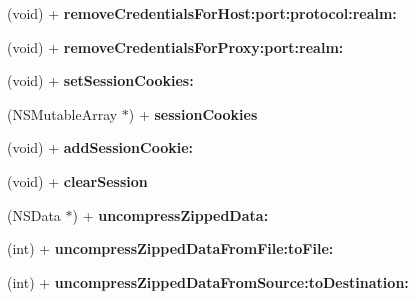 \begin{DoxyCompactItemize}
\item 
\hypertarget{interface_a_s_i_h_t_t_p_request_a5280dcb803450e7187587972ce540652}{
(void) + {\bfseries removeCredentialsForHost:port:protocol:realm:}}
\label{interface_a_s_i_h_t_t_p_request_a5280dcb803450e7187587972ce540652}

\item 
\hypertarget{interface_a_s_i_h_t_t_p_request_a213e5645cbf90459d6e7b987d24ddd33}{
(void) + {\bfseries removeCredentialsForProxy:port:realm:}}
\label{interface_a_s_i_h_t_t_p_request_a213e5645cbf90459d6e7b987d24ddd33}

\item 
\hypertarget{interface_a_s_i_h_t_t_p_request_aa1a0ecf9217c99bd0d252c0ff473ab22}{
(void) + {\bfseries setSessionCookies:}}
\label{interface_a_s_i_h_t_t_p_request_aa1a0ecf9217c99bd0d252c0ff473ab22}

\item 
\hypertarget{interface_a_s_i_h_t_t_p_request_a5995ee20ada072e51da56a940e0b0f28}{
(NSMutableArray $\ast$) + {\bfseries sessionCookies}}
\label{interface_a_s_i_h_t_t_p_request_a5995ee20ada072e51da56a940e0b0f28}

\item 
\hypertarget{interface_a_s_i_h_t_t_p_request_a9a6621daa1c2571d9d1cc0d46f912e56}{
(void) + {\bfseries addSessionCookie:}}
\label{interface_a_s_i_h_t_t_p_request_a9a6621daa1c2571d9d1cc0d46f912e56}

\item 
\hypertarget{interface_a_s_i_h_t_t_p_request_a85b93e4b30cdf106e45ee1b8d3a28f3d}{
(void) + {\bfseries clearSession}}
\label{interface_a_s_i_h_t_t_p_request_a85b93e4b30cdf106e45ee1b8d3a28f3d}

\item 
\hypertarget{interface_a_s_i_h_t_t_p_request_ab90a4101dc5b523195821de12ceae102}{
(NSData $\ast$) + {\bfseries uncompressZippedData:}}
\label{interface_a_s_i_h_t_t_p_request_ab90a4101dc5b523195821de12ceae102}

\item 
\hypertarget{interface_a_s_i_h_t_t_p_request_a2c4b220e54857d69fa7235bd6c78a294}{
(int) + {\bfseries uncompressZippedDataFromFile:toFile:}}
\label{interface_a_s_i_h_t_t_p_request_a2c4b220e54857d69fa7235bd6c78a294}

\item 
\hypertarget{interface_a_s_i_h_t_t_p_request_ae130a9053eb4b82f3bd963982ae835ac}{
(int) + {\bfseries uncompressZippedDataFromSource:toDestination:}}
\label{interface_a_s_i_h_t_t_p_request_ae130a9053eb4b82f3bd963982ae835ac}


\end{DoxyCompactItemize}

